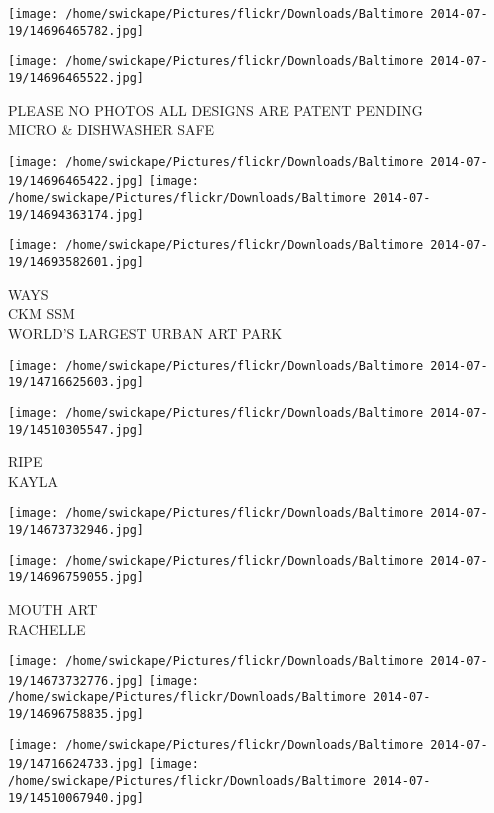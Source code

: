 \documentclass[10pt,letterpaper]{article}
\begin{document}
\texttt{[image: /home/swickape/Pictures/flickr/Downloads/Baltimore 2014-07-19/14696465782.jpg]}

\vspace{0.25in}
\texttt{[image: /home/swickape/Pictures/flickr/Downloads/Baltimore 2014-07-19/14696465522.jpg]}

PLEASE NO PHOTOS ALL DESIGNS ARE PATENT PENDING\\
MICRO \& DISHWASHER SAFE\\
\pagebreak

\texttt{[image: /home/swickape/Pictures/flickr/Downloads/Baltimore 2014-07-19/14696465422.jpg]}
\texttt{[image: /home/swickape/Pictures/flickr/Downloads/Baltimore 2014-07-19/14694363174.jpg]}

\texttt{[image: /home/swickape/Pictures/flickr/Downloads/Baltimore 2014-07-19/14693582601.jpg]}

WAYS\\
CKM SSM\\
WORLD'S LARGEST URBAN ART PARK\\
\pagebreak

\texttt{[image: /home/swickape/Pictures/flickr/Downloads/Baltimore 2014-07-19/14716625603.jpg]}

\vspace{0.25in}
\texttt{[image: /home/swickape/Pictures/flickr/Downloads/Baltimore 2014-07-19/14510305547.jpg]}

RIPE\\
KAYLA\\
\pagebreak

\texttt{[image: /home/swickape/Pictures/flickr/Downloads/Baltimore 2014-07-19/14673732946.jpg]}

\vspace{0.25in}
\texttt{[image: /home/swickape/Pictures/flickr/Downloads/Baltimore 2014-07-19/14696759055.jpg]}

MOUTH ART\\
RACHELLE\\
\pagebreak

\texttt{[image: /home/swickape/Pictures/flickr/Downloads/Baltimore 2014-07-19/14673732776.jpg]}
\texttt{[image: /home/swickape/Pictures/flickr/Downloads/Baltimore 2014-07-19/14696758835.jpg]}

\texttt{[image: /home/swickape/Pictures/flickr/Downloads/Baltimore 2014-07-19/14716624733.jpg]}
\texttt{[image: /home/swickape/Pictures/flickr/Downloads/Baltimore 2014-07-19/14510067940.jpg]}
\end{document}
